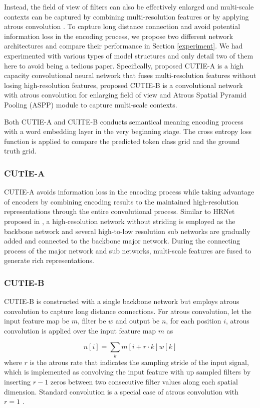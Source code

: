 \documentclass[10pt,twocolumn,letterpaper]{article}
\begin{document}
Instead, the field of view of filters can also be effectively enlarged and multi-scale contexts can be captured by combining multi-resolution features \cite{hrnet} or by applying atrous convolution \cite{deeplab, deeplabv1, deeplabv3, deeplabv3p}. To capture long distance connection and avoid potential information loss in the encoding process, we propose two different network architectures and compare their performance in Section \ref{experiment}. We had experimented with various types of model structures and only detail two of them here to avoid being a tedious paper. Specifically, proposed CUTIE-A is a high capacity convolutional neural network that fuses multi-resolution features without losing high-resolution features, proposed CUTIE-B is a convolutional network with atrous convolution for enlarging field of view and Atrous Spatial Pyramid Pooling (ASPP) module to capture multi-scale contexts. 

Both CUTIE-A and CUITE-B conducts semantical meaning encoding process with a word embedding layer in the very beginning stage. The cross entropy loss function is applied to compare the predicted token class grid and the ground truth grid.

\subsubsection{CUTIE-A}
CUTIE-A avoids information loss in the encoding process while taking advantage of encoders by combining encoding results to the maintained high-resolution representations through the entire convolutional process. Similar to HRNet proposed in \cite{hrnet}, a high-resolution network without striding is employed as the backbone network and several high-to-low resolution sub networks are gradually added and connected to the backbone major network. During the connecting process of the major network and sub networks, multi-scale features are fused to generate rich representations.

\subsubsection{CUTIE-B}
CUTIE-B is constructed with a single backbone network but employs atrous convolution to capture long distance connections. For atrous convolution, let the input feature map be $m$, filter be $w$ and output be $n$, for each position $i$, atrous convolution is applied over the input feature map $m$ as 

\begin{equation}
n[i] = \sum_k m[i+r\cdot k]w[k]
\end{equation}
where $r$ is the atrous rate that indicates the sampling stride of the input signal, which is implemented as convolving the input feature with up sampled filters by inserting $r-1$ zeros between two consecutive filter values along each spatial dimension. Standard convolution is a special case of atrous convolution with $r=1$ \cite{deeplabv1}.
\end{document}

